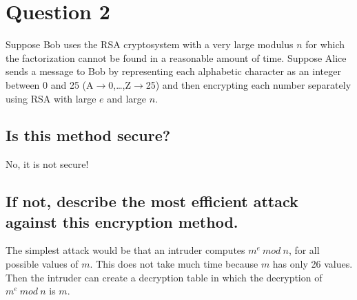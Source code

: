 \documentclass{report}
\begin{document}
	\section{Question 2}
	\startsection
		\renewcommand{\thesubsection}{\thesection.\Alph{subsection}}
		Suppose Bob uses the RSA cryptosystem with a very large modulus $n$ for which the factorization cannot be found in a reasonable amount of time. Suppose Alice sends a message to Bob by representing each alphabetic character as an integer between 0 and 25 (A$\rightarrow$0,…,Z$\rightarrow$25) and then encrypting each number separately using RSA with large $e$ and large $n$. 
		\subsection{Is this method secure?}
		\startsubsection
			No, it is not secure!
		\closesection
		\subsection{If not, describe the most efficient attack against this encryption method.}
		\startsubsection
			The simplest attack would be that an intruder computes $m^e \ mod \ n$, for all possible values of $m$. This does not take much time because $m$ has only 26 values. Then the intruder can create a decryption table in which the decryption of $m^e \ mod \ n$ is $m$.
		\closesection
	\closesection
\end{document}
